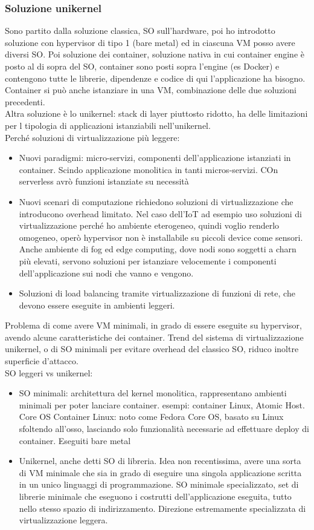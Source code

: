 \documentclass[16px]{article}
\begin{document}
\subsubsection{Soluzione unikernel}
Sono partito dalla soluzione classica, SO sull'hardware, poi ho introdotto soluzione con hypervisor di tipo 1 (bare metal) ed in ciascuna VM posso avere diversi SO. Poi soluzione dei container, soluzione nativa in cui container engine è posto al di sopra del SO, container sono posti sopra l'engine (es Docker) e contengono tutte le librerie, dipendenze e codice di qui l'applicazione ha bisogno. Container si può anche istanziare in una VM, combinazione delle due soluzioni precedenti.\\ Altra soluzione è lo unikernel: stack di layer piuttosto ridotto, ha delle limitazioni per l tipologia di applicazioni istanziabili nell'unikernel.\\ Perché soluzioni di virtualizzazione più leggere:
\begin{itemize}
\item Nuovi paradigmi:  micro-servizi, componenti dell'applicazione istanziati in container. Scindo applicazione monolitica in tanti micros-servizi. COn serverless avrò funzioni istanziate su necessità
\item Nuovi scenari di computazione richiedono soluzioni di virtualizzazione che introducono overhead limitato. Nel caso dell'IoT ad esempio uso soluzioni di virtualizzazione perché ho ambiente eterogeneo, quindi voglio renderlo omogeneo, operò hypervisor non è installabile su piccoli device come sensori. Anche ambiente di fog ed edge computing, dove nodi sono soggetti a charn più elevati, servono soluzioni per istanziare velocemente i componenti dell'applicazione sui nodi che vanno e vengono.
\item Soluzioni di load balancing tramite virtualizzazione di funzioni di rete, che devono essere eseguite in ambienti leggeri.
\end{itemize}
Problema di come avere VM minimali, in grado di essere eseguite su hypervisor, avendo alcune caratteristiche dei container. Trend del sistema di virtualizzazione unikernel, o di SO minimali per evitare overhead del classico SO, riduco inoltre superficie d'attacco.\\ SO leggeri vs unikernel:
\begin{itemize}
\item SO minimali: architettura del kernel monolitica, rappresentano ambienti minimali per poter lanciare container. esempi: container Linux, Atomic Host. Core OS Container Linux: noto come Fedora Core OS, basato su Linux sfoltendo all'osso, lasciando solo funzionalità necessarie ad effettuare deploy di container. Eseguiti bare metal
\item Unikernel, anche detti SO di libreria. Idea non recentissima, avere una sorta di VM minimale che sia in grado di eseguire una singola applicazione scritta in un unico linguaggi di programmazione. SO minimale specializzato, set di librerie minimale che eseguono i costrutti dell'applicazione eseguita, tutto nello stesso spazio di indirizzamento. Direzione estremamente specializzata di virtualizzazione leggera.
\end{itemize}
\end{document}
